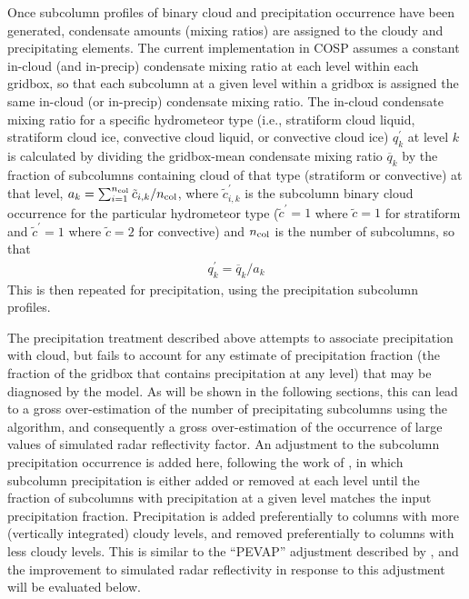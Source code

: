 Once subcolumn profiles of binary cloud and precipitation occurrence have been generated, condensate amounts (mixing ratios) are assigned to the cloudy and precipitating elements. The current implementation in COSP assumes a constant in-cloud (and in-precip) condensate mixing ratio at each level within each gridbox, so that each subcolumn at a given level within a gridbox is assigned the same in-cloud (or in-precip) condensate mixing ratio. The in-cloud condensate mixing ratio for a specific hydrometeor type (i.e., stratiform cloud liquid, stratiform cloud ice, convective cloud liquid, or convective cloud ice) $q^\prime_k$ at level $k$ is calculated by dividing the gridbox-mean condensate mixing ratio $\overline{q}_k$ by the fraction of subcolumns containing cloud of that type (stratiform or convective) at that level, $a_k = \sum_{i = 1}^{n_{\rm col}} \tilde{c}_{i, k} / n_{\rm col}$, where $\tilde{c}^{\prime}_{i, k}$ is the subcolumn binary cloud occurrence for the particular hydrometeor type ($\tilde{c}^\prime = 1$ where $\tilde{c} = 1$ for stratiform and $\tilde{c}^\prime = 1$ where $\tilde{c} = 2$ for convective) and $n_{\rm col}$ is the number of subcolumns, so that
\begin{gather}
q^\prime_k = \overline{q}_k / a_k
\end{gather}
This is then repeated for precipitation, using the precipitation subcolumn profiles.

The precipitation treatment described above attempts to associate precipitation with cloud, but fails to account for any estimate of precipitation fraction (the fraction of the gridbox that contains precipitation at any level) that may be diagnosed by the model. As will be shown in the following sections, this can lead to a gross over-estimation of the number of precipitating subcolumns using the \cite{zhang_et_al_2010} algorithm, and consequently a gross over-estimation of the occurrence of large values of simulated radar reflectivity factor. An adjustment to the subcolumn precipitation occurrence is added here, following the work of \cite{dimichele_et_al_2012}, in which subcolumn precipitation is either added or removed at each level until the fraction of subcolumns with precipitation at a given level matches the input precipitation fraction. Precipitation is added preferentially to columns with more (vertically integrated) cloudy levels, and removed preferentially to columns with less cloudy levels. This is similar to the ``PEVAP'' adjustment described by \cite{dimichele_et_al_2012}, and the improvement to simulated radar reflectivity in response to this adjustment will be evaluated below.

